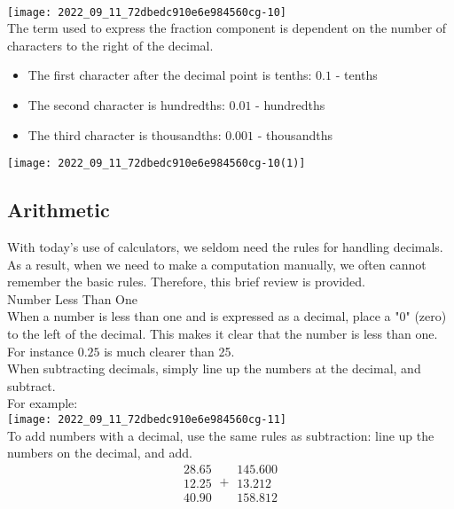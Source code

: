\\

\texttt{[image: 2022\_09\_11\_72dbedc910e6e984560cg-10]}\\
The term used to express the fraction component is dependent on the number of characters to the right of the decimal.

\begin{itemize}
  \item The first character after the decimal point is tenths: $0.1$ - tenths

  \item The second character is hundredths: $0.01$ - hundredths

  \item The third character is thousandths: $0.001$ - thousandths

\end{itemize}
\texttt{[image: 2022\_09\_11\_72dbedc910e6e984560cg-10(1)]}
\subsection{Arithmetic}

With today's use of calculators, we seldom need the rules for handling decimals. As a result, when we need to make a computation manually, we often cannot remember the basic rules. Therefore, this brief review is provided.\\

Number Less Than One\\

When a number is less than one and is expressed as a decimal, place a "0" (zero) to the left of the decimal. This makes it clear that the number is less than one. For instance $0.25$ is much clearer than 25.\\

When subtracting decimals, simply line up the numbers at the decimal, and subtract.\\

For example:\\

\texttt{[image: 2022\_09\_11\_72dbedc910e6e984560cg-11]}\\

To add numbers with a decimal, use the same rules as subtraction: line up the numbers on the decimal, and add.
$$
\begin{array}{r}
28.65 \\
12.25 \\
\hline 40.90
\end{array}+\begin{array}{r}
145.600 \\
13.212 \\
\hline 158.812
\end{array}
$$

